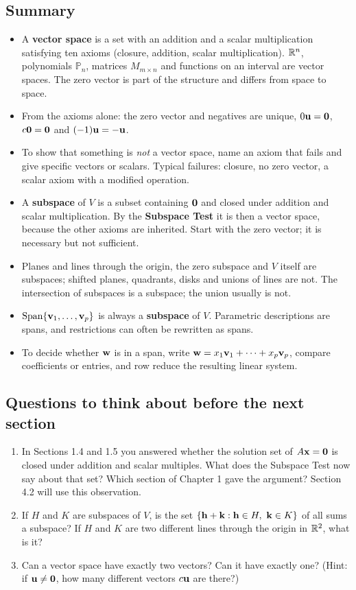 \documentclass[11pt]{article}
\begin{document}
\subsection*{Summary}
\begin{itemize}
  \item A \textbf{vector space} is a set with an addition and a scalar multiplication satisfying ten axioms (closure, addition, scalar multiplication). $\mathbb{R}^n$, polynomials $\mathbb{P}_n$, matrices $M_{m\times n}$ and functions on an interval are vector spaces. The zero vector is part of the structure and differs from space to space.
  \item From the axioms alone: the zero vector and negatives are unique, $0\mathbf{u}=\mathbf{0}$, $c\mathbf{0}=\mathbf{0}$ and $(-1)\mathbf{u}=-\mathbf{u}$.
  \item To show that something is \emph{not} a vector space, name an axiom that fails and give specific vectors or scalars. Typical failures: closure, no zero vector, a scalar axiom with a modified operation.
  \item A \textbf{subspace} of $V$ is a subset containing $\mathbf{0}$ and closed under addition and scalar multiplication. By the \textbf{Subspace Test} it is then a vector space, because the other axioms are inherited. Start with the zero vector; it is necessary but not sufficient.
  \item Planes and lines through the origin, the zero subspace and $V$ itself are subspaces; shifted planes, quadrants, disks and unions of lines are not. The intersection of subspaces is a subspace; the union usually is not.
  \item $\operatorname{Span}\{\mathbf{v}_1,\dots,\mathbf{v}_p\}$ is always a \textbf{subspace} of $V$. Parametric descriptions are spans, and restrictions can often be rewritten as spans.
  \item To decide whether $\mathbf{w}$ is in a span, write $\mathbf{w}=x_1\mathbf{v}_1+\cdots+x_p\mathbf{v}_p$, compare coefficients or entries, and row reduce the resulting linear system.
\end{itemize}

\subsection*{Questions to think about before the next section}
\begin{enumerate}
  \item In Sections 1.4 and 1.5 you answered whether the solution set of $A\mathbf{x}=\mathbf{0}$ is closed under addition and scalar multiples. What does the Subspace Test now say about that set? Which section of Chapter 1 gave the argument? Section 4.2 will use this observation.
  \item If $H$ and $K$ are subspaces of $V$, is the set $\{\bv{h}+\bv{k}:\bv{h}\in H,\ \bv{k}\in K\}$ of all sums a subspace? If $H$ and $K$ are two different lines through the origin in $\mathbb{R}^2$, what is it?
  \item Can a vector space have exactly two vectors? Can it have exactly one? (Hint: if $\mathbf{u}\neq\mathbf{0}$, how many different vectors $c\mathbf{u}$ are there?)
\end{enumerate}
\end{document}
